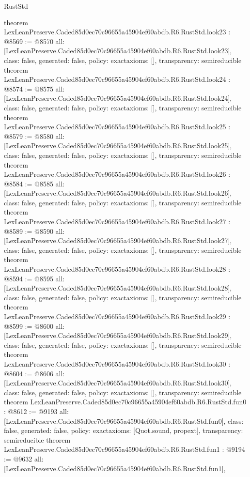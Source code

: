 \begin{lexlean}{RustStd}
\begin{coremodule}
{}
theorem LexLeanPreserve.Caded85d0ec70c96655a45904ef60abdb.R6.RustStd.look23 : @8569 := @8570 {
  all: [LexLeanPreserve.Caded85d0ec70c96655a45904ef60abdb.R6.RustStd.look23],
  class: false,
  generated: false,
  policy: exact{axioms: []},
  transparency: semireducible
}
theorem LexLeanPreserve.Caded85d0ec70c96655a45904ef60abdb.R6.RustStd.look24 : @8574 := @8575 {
  all: [LexLeanPreserve.Caded85d0ec70c96655a45904ef60abdb.R6.RustStd.look24],
  class: false,
  generated: false,
  policy: exact{axioms: []},
  transparency: semireducible
}
theorem LexLeanPreserve.Caded85d0ec70c96655a45904ef60abdb.R6.RustStd.look25 : @8579 := @8580 {
  all: [LexLeanPreserve.Caded85d0ec70c96655a45904ef60abdb.R6.RustStd.look25],
  class: false,
  generated: false,
  policy: exact{axioms: []},
  transparency: semireducible
}
theorem LexLeanPreserve.Caded85d0ec70c96655a45904ef60abdb.R6.RustStd.look26 : @8584 := @8585 {
  all: [LexLeanPreserve.Caded85d0ec70c96655a45904ef60abdb.R6.RustStd.look26],
  class: false,
  generated: false,
  policy: exact{axioms: []},
  transparency: semireducible
}
theorem LexLeanPreserve.Caded85d0ec70c96655a45904ef60abdb.R6.RustStd.look27 : @8589 := @8590 {
  all: [LexLeanPreserve.Caded85d0ec70c96655a45904ef60abdb.R6.RustStd.look27],
  class: false,
  generated: false,
  policy: exact{axioms: []},
  transparency: semireducible
}
theorem LexLeanPreserve.Caded85d0ec70c96655a45904ef60abdb.R6.RustStd.look28 : @8594 := @8595 {
  all: [LexLeanPreserve.Caded85d0ec70c96655a45904ef60abdb.R6.RustStd.look28],
  class: false,
  generated: false,
  policy: exact{axioms: []},
  transparency: semireducible
}
theorem LexLeanPreserve.Caded85d0ec70c96655a45904ef60abdb.R6.RustStd.look29 : @8599 := @8600 {
  all: [LexLeanPreserve.Caded85d0ec70c96655a45904ef60abdb.R6.RustStd.look29],
  class: false,
  generated: false,
  policy: exact{axioms: []},
  transparency: semireducible
}
theorem LexLeanPreserve.Caded85d0ec70c96655a45904ef60abdb.R6.RustStd.look30 : @8604 := @8606 {
  all: [LexLeanPreserve.Caded85d0ec70c96655a45904ef60abdb.R6.RustStd.look30],
  class: false,
  generated: false,
  policy: exact{axioms: []},
  transparency: semireducible
}
theorem LexLeanPreserve.Caded85d0ec70c96655a45904ef60abdb.R6.RustStd.fun0 : @8612 := @9193 {
  all: [LexLeanPreserve.Caded85d0ec70c96655a45904ef60abdb.R6.RustStd.fun0],
  class: false,
  generated: false,
  policy: exact{axioms: [Quot.sound, propext]},
  transparency: semireducible
}
theorem LexLeanPreserve.Caded85d0ec70c96655a45904ef60abdb.R6.RustStd.fun1 : @9194 := @9632 {
  all: [LexLeanPreserve.Caded85d0ec70c96655a45904ef60abdb.R6.RustStd.fun1],
}
\end{coremodule}
\end{lexlean}
